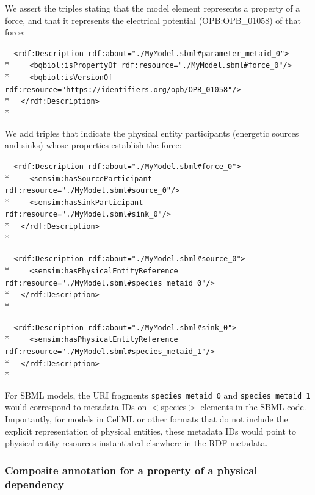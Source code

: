 \documentclass[pdftex,rgb,dvipsnames,svgnames,hyperref,table]{report}
\begin{document}
We assert the triples stating that the model element represents a property of a force, and that it represents the electrical potential (OPB:OPB\_01058) of that force:

  \verb|  <rdf:Description rdf:about="./MyModel.sbml#parameter_metaid_0">|\\*
  \verb|    <bqbiol:isPropertyOf rdf:resource="./MyModel.sbml#force_0"/>|\\*
  \verb|    <bqbiol:isVersionOf rdf:resource="https://identifiers.org/opb/OPB_01058"/>|\\*
  \verb|  </rdf:Description>|\\*
  
We add triples that indicate the physical entity participants (energetic sources and sinks) whose properties establish the force:

  \verb|  <rdf:Description rdf:about="./MyModel.sbml#force_0">|\\*
  \verb|    <semsim:hasSourceParticipant rdf:resource="./MyModel.sbml#source_0"/>|\\*
  \verb|    <semsim:hasSinkParticipant rdf:resource="./MyModel.sbml#sink_0"/>|\\*
  \verb|  </rdf:Description>|\\*
  
  \verb|  <rdf:Description rdf:about="./MyModel.sbml#source_0">|\\*
  \verb|    <semsim:hasPhysicalEntityReference rdf:resource="./MyModel.sbml#species_metaid_0"/>|\\*
  \verb|  </rdf:Description>|\\*
  
  \verb|  <rdf:Description rdf:about="./MyModel.sbml#sink_0">|\\*
  \verb|    <semsim:hasPhysicalEntityReference rdf:resource="./MyModel.sbml#species_metaid_1"/>|\\*
  \verb|  </rdf:Description>|\\*
  
  
  
For SBML models, the URI fragments \texttt{species\_metaid\_0} and \texttt{species\_metaid\_1} would correspond to metadata IDs on $<$species$>$ elements in the SBML code. Importantly, for models in CellML or other formats that do not include the explicit representation of physical entities, these metadata IDs would point to physical entity resources instantiated elsewhere in the RDF metadata.

\subsubsection{Composite annotation for a property of a physical dependency}
\end{document}
